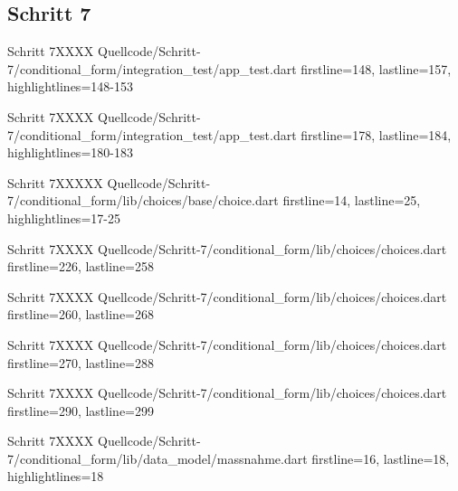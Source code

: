 \clearpage 

\subsection{Schritt 7}

\begin{alexlisting}{Schritt 7}{XXXX}
    {Quellcode/Schritt-7/conditional_form/integration_test/app_test.dart}
    {firstline=148, lastline=157, highlightlines={148-153}}
    \label{lst:Schritt5XXXX}
  \end{alexlisting}

  \begin{alexlisting}{Schritt 7}{XXXX}
    {Quellcode/Schritt-7/conditional_form/integration_test/app_test.dart}
    {firstline=178, lastline=184, highlightlines={180-183}}
    \label{lst:Schritt5XXXX}
  \end{alexlisting}


  \begin{alexlisting}{Schritt 7}{XXXXX}
    {Quellcode/Schritt-7/conditional_form/lib/choices/base/choice.dart}
    {firstline=14, lastline=25, highlightlines={17-25}}
    \label{lst:Schritt4XXXXX}
  \end{alexlisting}

  \begin{alexlisting}{Schritt 7}{XXXX}
    {Quellcode/Schritt-7/conditional_form/lib/choices/choices.dart}
    {firstline=226, lastline=258}
    \label{lst:Schritt5XXXX}
  \end{alexlisting}

  \begin{alexlisting}{Schritt 7}{XXXX}
    {Quellcode/Schritt-7/conditional_form/lib/choices/choices.dart}
    {firstline=260, lastline=268}
    \label{lst:Schritt5XXXX}
  \end{alexlisting}

  \begin{alexlisting}{Schritt 7}{XXXX}
    {Quellcode/Schritt-7/conditional_form/lib/choices/choices.dart}
    {firstline=270, lastline=288}
    \label{lst:Schritt5XXXX}
  \end{alexlisting}

  \begin{alexlisting}{Schritt 7}{XXXX}
    {Quellcode/Schritt-7/conditional_form/lib/choices/choices.dart}
    {firstline=290, lastline=299}
    \label{lst:Schritt5XXXX}
  \end{alexlisting}


  \begin{alexlisting}{Schritt 7}{XXXX}
    {Quellcode/Schritt-7/conditional_form/lib/data_model/massnahme.dart}
    {firstline=16, lastline=18, highlightlines={18}}
    \label{lst:Schritt5XXXX}
  \end{alexlisting}

